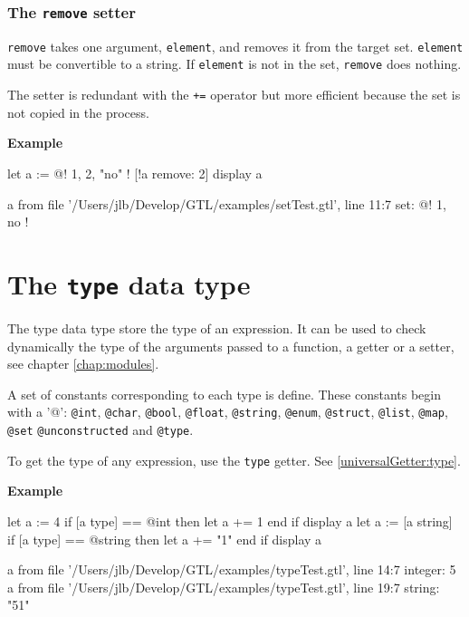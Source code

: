 \documentclass[10pt,openright,twosides,final]{memoir}
\newcommand{\gtltype}[1]{{\small\ttfamily #1}}
\newcommand{\ccst}[1]{{\footnotesize\ttfamily\colorbox{light-blue}{'#1'}}}
\newcommand{\gtlinline}[1]{\colorbox{light-blue}{\lstinline[language=gtl]{#1}}}
\newcommand{\example}{\vspace{.75em}\noindent\textbf{Example}\vspace{0em}}
\begin{document}
\subsubsection{The \texttt{remove} setter}

\gtlinline{remove} takes one argument, \gtlinline{element}, and removes it from the target set. \gtlinline{element} must be convertible to a string. If \gtlinline{element} is not in the set, \gtlinline{remove} does nothing.

The setter is redundant with the \gtlinline{+=} operator but more efficient because the set is not copied in the process.

\example
\begin{gtl}
let a := @! 1, 2, "no" !
[!a remove: 2]
display a
\end{gtl}
\begin{console}
a from file '/Users/jlb/Develop/GTL/examples/setTest.gtl', line 11:7
    set: @!
        1, no
    !
\end{console}

\section{The \texttt{type} data type}
\label{sec:type}

The \gtltype{type} data type store the type of an expression. It can be used to check dynamically the type of the arguments passed to a function, a getter or a setter, see chapter \ref{chap:modules}.

A set of constants corresponding to each type is define. These constants begin with a \ccst{@}: \gtlinline{@int}, \gtlinline{@char}, \gtlinline{@bool}, \gtlinline{@float}, \gtlinline{@string}, \gtlinline{@enum}, \gtlinline{@struct}, \gtlinline{@list}, \gtlinline{@map}, \gtlinline{@set} \gtlinline{@unconstructed} and \gtlinline{@type}.

To get the type of any expression, use the \gtlinline{type} getter. See \ref{universalGetter:type}.

\example
\begin{gtl}
let a := 4
if [a type] == @int then
  let a += 1
end if
display a
let a := [a string]
if [a type] == @string then
  let a += "1"
end if
display a
\end{gtl}
\begin{console}
a from file '/Users/jlb/Develop/GTL/examples/typeTest.gtl', line 14:7
    integer: 5
a from file '/Users/jlb/Develop/GTL/examples/typeTest.gtl', line 19:7
    string: "51"
\end{console}
\end{document}
